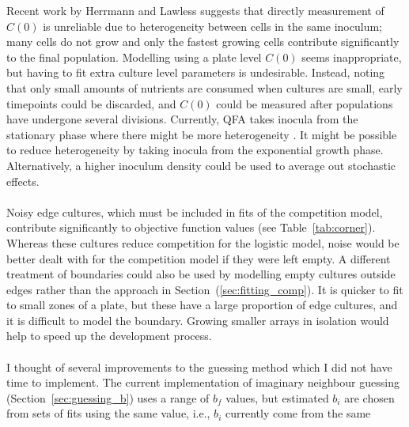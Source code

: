 Recent work by Herrmann and Lawless suggests that directly measurement
of \(C(0)\) is unreliable due to heterogeneity between cells in the
same inoculum; many cells do not grow and only the fastest growing
cells contribute significantly to the final population. Modelling
using a plate level \(C(0)\) seems inappropriate, but having to fit
extra culture level parameters is undesirable. Instead, noting that
only small amounts of nutrients are consumed when cultures are small,
early timepoints could be discarded, and \(C(0)\) could be measured
after populations have undergone several divisions. Currently, QFA
takes inocula from the stationary phase where there might be more
heterogeneity \citep{bergkessel2016}. It might be possible to reduce
heterogeneity by taking inocula from the exponential growth
phase. Alternatively, a higher inoculum density could be used to
average out stochastic effects.
\\\\
Noisy edge cultures, which must be included in fits of the competition
model, contribute significantly to objective function values (see
Table~\ref{tab:corner}). Whereas these cultures reduce competition for
the logistic model, noise would be better dealt with for the
competition model if they were left empty. A different treatment of
boundaries could also be used by modelling empty cultures outside
edges rather than the approach in Section~(\ref{sec:fitting_comp}).
It is quicker to fit to small zones of a plate, but these have a large
proportion of edge cultures, and it is difficult to model the
boundary. Growing smaller arrays in isolation would help to speed up
the development process.
\\\\
I thought of several improvements to the guessing method which I did
not have time to implement. The current implementation of imaginary
neighbour guessing (Section~\ref{sec:guessing_b}) uses a range of
\(b_{f}\) values, but estimated \(b_{i}\) are chosen from sets of fits
using the same value, i.e., \(b_{i}\) currently come from the same
